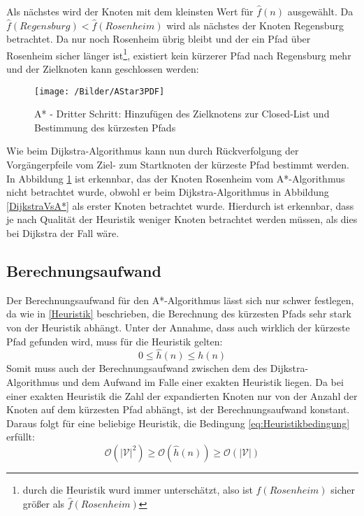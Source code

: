 		Als nächstes wird der Knoten mit dem kleinsten Wert  für $\hat{f}(n)$ ausgewählt. Da $\hat{f}(Regensburg)<\hat{f}(Rosenheim)$ wird als nächstes der Knoten Regensburg betrachtet. Da nur noch Rosenheim übrig bleibt und der ein Pfad über Rosenheim sicher länger ist\footnote{durch die Heuristik wurd immer unterschätzt, also ist $f(Rosenheim)$ sicher größer als $\hat{f}(Rosenheim)$}, existiert kein kürzerer Pfad nach Regensburg mehr und der Zielknoten kann geschlossen werden:

		\begin{figure}[H]
			\centering
			\texttt{[image: /Bilder/AStar3PDF]}
			\vspace{0.2cm}
			\caption{A* - Dritter Schritt: Hinzufügen des Zielknotens zur Closed-List und Bestimmung des kürzesten Pfads} \label{A*3}
		\end{figure}
		
		Wie beim Dijkstra-Algorithmus kann nun durch Rückverfolgung der Vorgängerpfeile vom Ziel- zum Startknoten der kürzeste Pfad bestimmt werden. In Abbildung \ref{A*3} ist erkennbar, das der Knoten Rosenheim vom A*-Algorithmus nicht betrachtet wurde, obwohl er beim Dijkstra-Algorithmus in Abbildung \ref{DijkstraVsA*} als erster Knoten betrachtet wurde. Hierdurch ist erkennbar, dass je nach Qualität der Heuristik weniger Knoten betrachtet werden müssen, als dies bei Dijkstra der Fall wäre.
	
	\subsection{Berechnungsaufwand}
		\label{Aufwand_A*}
		Der Berechnungsaufwand für den A*-Algorithmus lässt sich nur schwer festlegen, da wie in \ref{Heuristik} beschrieben, die Berechnung des kürzesten Pfads sehr stark von der Heuristik abhängt. Unter der Annahme, dass auch wirklich der kürzeste Pfad gefunden wird, muss für die Heuristik gelten:
		\begin{equation} \label{eq:Heuristikbedingung}
			0\le \hat{h}(n)\le h(n)
		\end{equation}
		Somit muss auch der Berechnungsaufwand zwischen dem des Dijkstra-Algorithmus und dem Aufwand im Falle einer exakten Heuristik liegen. Da bei einer exakten Heuristik die Zahl der expandierten Knoten nur von der Anzahl der Knoten auf dem kürzesten Pfad abhängt, ist der Berechnungsaufwand konstant. Daraus folgt für eine beliebige Heuristik, die Bedingung \ref{eq:Heuristikbedingung} erfüllt:
		\begin{equation}
			\mathcal{O}(\lvert \mathcal{V}\rvert ^2)\ge \mathcal{O}(\hat{h}(n))\ge \mathcal{O}(\lvert \mathcal{V}\rvert)
		\end{equation}
		

